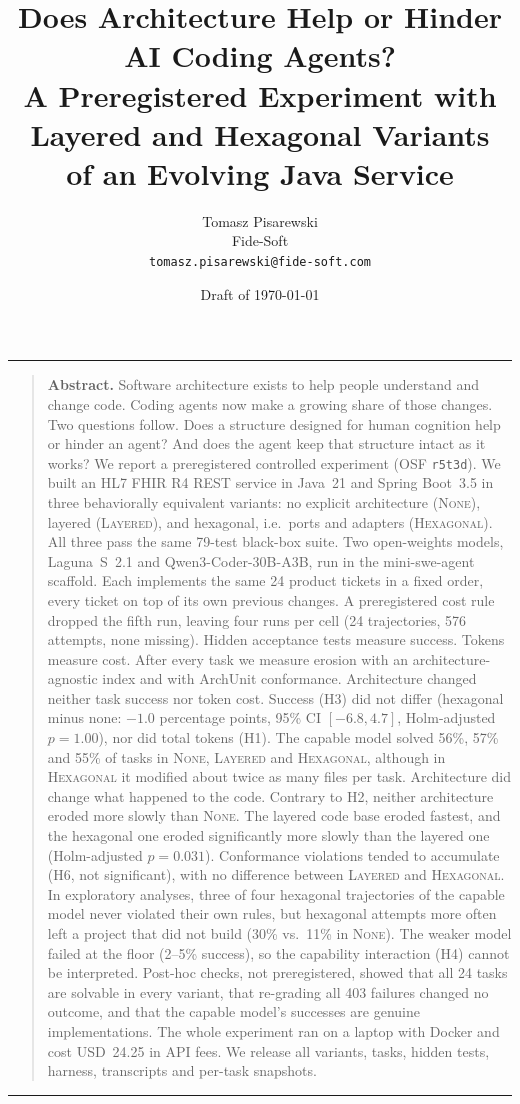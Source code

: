 \documentclass[10pt]{article}
\title{\vspace{-1.3em}\bfseries\Large Does Architecture Help or Hinder AI Coding Agents?\\[0.4em]
\large\mdseries A Preregistered Experiment with Layered and Hexagonal Variants\\ of an Evolving Java Service}
\author{%
  Tomasz Pisarewski\\
  \normalsize Fide-Soft\\
  \normalsize \texttt{tomasz.pisarewski@fide-soft.com}}
\date{Draft of \today}
\renewenvironment{abstract}{%
  \begin{center}\rule{\textwidth}{0.4pt}\end{center}\vspace{-0.9em}
  \begin{quotation}\small\noindent\textbf{Abstract.}\enspace}
  {\end{quotation}\vspace{-0.6em}\begin{center}\rule{\textwidth}{0.4pt}\end{center}\vspace{0.4em}}
\newcommand{\NONE}{\textsc{None}}
\newcommand{\LAY}{\textsc{Layered}}
\newcommand{\HEX}{\textsc{Hexagonal}}
\newcommand{\code}[1]{\texttt{#1}}
\begin{document}
\maketitle

\begin{abstract}
\noindent
Software architecture exists to help people understand and change code. Coding agents now make a
growing share of those changes. Two questions follow. Does a structure designed for human
cognition help or hinder an agent? And does the agent keep that structure intact as it works? We
report a preregistered controlled experiment (OSF \code{r5t3d}). We built an HL7 FHIR R4 REST
service in Java~21 and Spring Boot~3.5 in three behaviorally equivalent variants: no explicit
architecture (\NONE), layered (\LAY), and hexagonal, i.e.\ ports and adapters (\HEX). All three
pass the same 79-test black-box suite. Two open-weights models, Laguna~S~2.1 and
Qwen3-Coder-30B-A3B, run in the mini-swe-agent scaffold. Each implements the same 24 product
tickets in a fixed order, every ticket on top of its own previous changes. A preregistered cost
rule dropped the fifth run, leaving four runs per cell (24 trajectories, 576 attempts, none
missing). Hidden acceptance tests measure success. Tokens measure cost. After every task we
measure erosion with an architecture-agnostic index and with ArchUnit conformance.
Architecture changed neither task success nor token cost. Success (H3) did not differ (hexagonal
minus none: $-1.0$ percentage points, 95\% CI $[-6.8, 4.7]$, Holm-adjusted $p=1.00$), nor did
total tokens (H1). The capable model solved 56\%, 57\% and 55\% of tasks in \NONE, \LAY{} and
\HEX, although in \HEX{} it modified about twice as many files per task. Architecture did change what happened to the code. Contrary to H2, neither architecture
eroded more slowly than \NONE. The layered code base eroded fastest, and the hexagonal one eroded
significantly more slowly than the layered one (Holm-adjusted $p=0.031$). Conformance violations
tended to accumulate (H6, not significant), with no difference between \LAY{} and \HEX. In
exploratory analyses, three of four hexagonal trajectories of the capable model never violated
their own rules, but hexagonal attempts more often left a project that did not build (30\% vs.\
11\% in \NONE). The weaker model failed at the floor (2--5\% success), so the capability
interaction (H4) cannot be interpreted. Post-hoc checks, not preregistered, showed that all 24
tasks are solvable in every variant, that re-grading all 403 failures changed no outcome, and that
the capable model's successes are genuine implementations. The whole experiment ran on a laptop with Docker and cost
USD~24.25 in API fees. We release all variants, tasks, hidden tests, harness, transcripts and
per-task snapshots.
\end{abstract}
\end{document}
